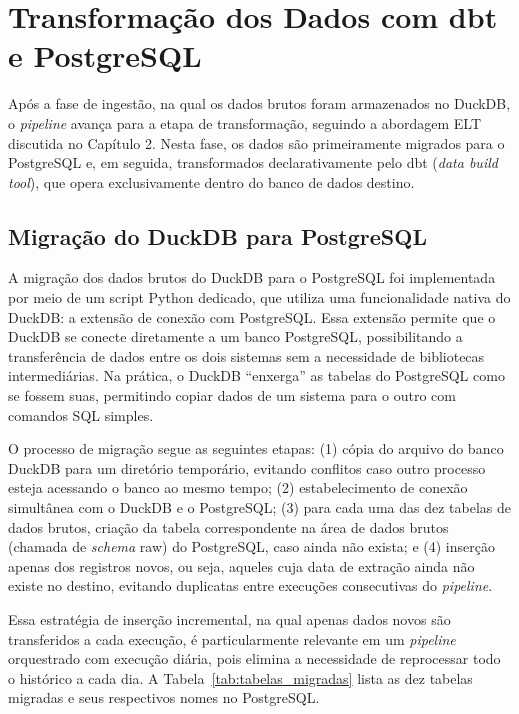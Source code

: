 \section{Transformação dos Dados com dbt e PostgreSQL}

Após a fase de ingestão, na qual os dados brutos foram armazenados no DuckDB, o
\textit{pipeline} avança para a etapa de transformação, seguindo a abordagem ELT
discutida no Capítulo 2. Nesta fase, os dados são primeiramente migrados para o
PostgreSQL e, em seguida, transformados declarativamente pelo dbt
(\textit{data build tool}), que opera exclusivamente dentro do banco de dados destino.

\subsection{Migração do DuckDB para PostgreSQL}

A migração dos dados brutos do DuckDB para o PostgreSQL foi implementada por meio de
um script Python dedicado, que utiliza uma funcionalidade nativa do DuckDB: a extensão
de conexão com PostgreSQL. Essa extensão permite que o DuckDB se conecte diretamente
a um banco PostgreSQL, possibilitando a transferência de dados entre os dois sistemas
sem a necessidade de bibliotecas intermediárias. Na prática, o DuckDB ``enxerga'' as
tabelas do PostgreSQL como se fossem suas, permitindo copiar dados de um sistema para
o outro com comandos SQL simples.

O processo de migração segue as seguintes etapas: (1) cópia do arquivo do banco DuckDB
para um diretório temporário, evitando conflitos caso outro processo esteja acessando
o banco ao mesmo tempo; (2) estabelecimento de conexão simultânea com o DuckDB e o
PostgreSQL; (3) para cada uma das dez tabelas de dados brutos, criação da tabela
correspondente na área de dados brutos (chamada de \textit{schema} raw) do PostgreSQL,
caso ainda não exista; e (4) inserção apenas dos registros novos, ou seja, aqueles
cuja data de extração ainda não existe no destino, evitando duplicatas entre execuções
consecutivas do \textit{pipeline}.

Essa estratégia de inserção incremental, na qual apenas dados novos são transferidos a
cada execução, é particularmente relevante em um \textit{pipeline} orquestrado com
execução diária, pois elimina a necessidade de reprocessar todo o histórico a cada dia.
A Tabela~\ref{tab:tabelas_migradas} lista as dez tabelas migradas e seus respectivos
nomes no PostgreSQL.

